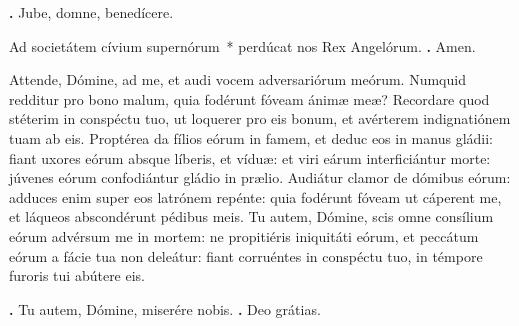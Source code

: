 \begin{small}
\textbf{\Vbar.} Jube, domne, benedícere.

Ad societátem cívium supernórum~* perdúcat nos Rex Angelórum. \textbf{\Rbar.} Amen.
\end{small}


Attende, Dómine, ad me, et audi vocem adversariórum meórum.
Numquid redditur pro bono malum, quia fodérunt fóveam ánimæ meæ? Recordare quod stéterim in conspéctu tuo, ut loquerer pro eis bonum, et avérterem indignatiónem tuam ab eis.
Proptérea da fílios eórum in famem, et deduc eos in manus gládii: fiant uxores eórum absque líberis, et víduæ: et viri eárum interficiántur morte: júvenes eórum confodiántur gládio in prælio.
Audiátur clamor de dómibus eórum: adduces enim super eos latrónem repénte: quia fodérunt fóveam ut cáperent me, et láqueos abscondérunt pédibus meis.
Tu autem, Dómine, scis omne consílium eórum advérsum me in mortem: ne propitiéris iniquitáti eórum, et peccátum eórum a fácie tua non deleátur: fiant corruéntes in conspéctu tuo, in témpore furoris tui abútere eis.

\textbf{\Vbar.} Tu autem, Dómine, miserére nobis.
\textbf{\Rbar.} Deo grátias.

